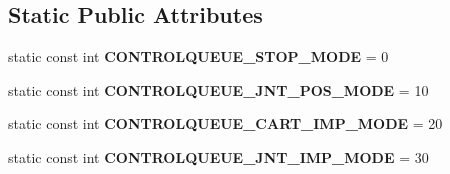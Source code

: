 \subsection*{Static Public Attributes}
\begin{DoxyCompactItemize}
\item 
static const int {\bfseries C\+O\+N\+T\+R\+O\+L\+Q\+U\+E\+U\+E\+\_\+\+S\+T\+O\+P\+\_\+\+M\+O\+DE} = 0\hypertarget{classkukadu_1_1ControlQueue_a1a207e4332a8b1ac5a8bf425d697570f}{}\label{classkukadu_1_1ControlQueue_a1a207e4332a8b1ac5a8bf425d697570f}

\item 
static const int {\bfseries C\+O\+N\+T\+R\+O\+L\+Q\+U\+E\+U\+E\+\_\+\+J\+N\+T\+\_\+\+P\+O\+S\+\_\+\+M\+O\+DE} = 10\hypertarget{classkukadu_1_1ControlQueue_a9c8511060b437868de842e7456f18018}{}\label{classkukadu_1_1ControlQueue_a9c8511060b437868de842e7456f18018}

\item 
static const int {\bfseries C\+O\+N\+T\+R\+O\+L\+Q\+U\+E\+U\+E\+\_\+\+C\+A\+R\+T\+\_\+\+I\+M\+P\+\_\+\+M\+O\+DE} = 20\hypertarget{classkukadu_1_1ControlQueue_a664a52e365e9185a0aef587e331fe94f}{}\label{classkukadu_1_1ControlQueue_a664a52e365e9185a0aef587e331fe94f}

\item 
static const int {\bfseries C\+O\+N\+T\+R\+O\+L\+Q\+U\+E\+U\+E\+\_\+\+J\+N\+T\+\_\+\+I\+M\+P\+\_\+\+M\+O\+DE} = 30\hypertarget{classkukadu_1_1ControlQueue_a8372490df9e7fbfa75afb9cfe1c0e6b4}{}\label{classkukadu_1_1ControlQueue_a8372490df9e7fbfa75afb9cfe1c0e6b4}

\end{DoxyCompactItemize}

